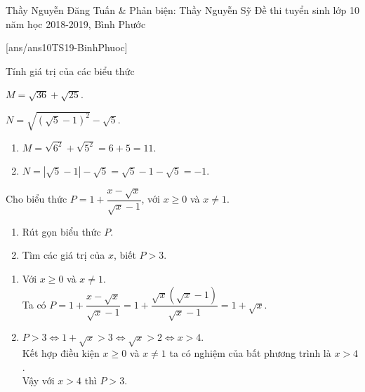 
\begin{name}
{Thầy Nguyễn Đăng Tuấn \& Phản biện: Thầy Nguyễn Sỹ}
{Đề thi tuyển sinh lớp 10 năm học 2018-2019, Bình Phước}
\end{name}
\setcounter{ex}{0}
[ans/ans10TS19-BinhPhuoc]
\begin{ex}%
Tính giá trị của các biểu thức
\begin{listEX}[2]
\item $M=\sqrt{36}+\sqrt{25}$.
\item $N=\sqrt{\left(\sqrt{5}-1\right)^2}-\sqrt{5}$.
\end{listEX}
	\loigiai
{
\begin{enumerate}
\item $M=\sqrt{6^2}+\sqrt{5^2}=6+5=11$.
\item $N=\left|\sqrt{5}-1\right|-\sqrt{5}=\sqrt{5}-1-\sqrt{5}=-1$.
\end{enumerate}
}
\end{ex}



\begin{ex}%
Cho biểu thức $P=1+\dfrac{x-\sqrt{x}}{\sqrt{x}-1}$, với $x\geq0$ và $x \neq 1$.
\begin{enumerate}
\item Rút gọn biểu thức $P$.
\item Tìm các giá trị của $x$, biết $P>3$.
\end{enumerate}
	\loigiai
{
\begin{enumerate}
\item Với $x\geq0$ và $x \neq 1$.\\
Ta có $P=1+\dfrac{x-\sqrt{x}}{\sqrt{x}-1}
=1+\dfrac{\sqrt{x}\left(\sqrt{x}-1\right)}{\sqrt{x}-1}
=1+\sqrt{x}$.
\item $P>3\Leftrightarrow 1+\sqrt{x}>3\Leftrightarrow \sqrt{x}>2\Leftrightarrow x>4$.\\
Kết hợp điều kiện $x\geq0$ và $x\neq1$ ta có nghiệm của bất phương trình là $x>4$.\\
Vậy với $x>4$ thì $P>3$.
\end{enumerate}	
}
\end{ex}

